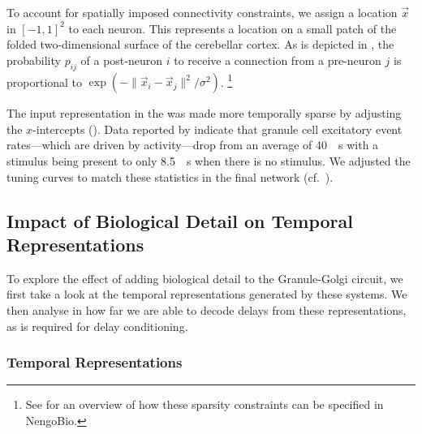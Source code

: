To account for spatially imposed connectivity constraints, we assign a location $\vec x$ in $[-1, 1]^2$ to each neuron.
This represents a location on a small patch of the folded two-dimensional surface of the cerebellar cortex.
As is depicted in , the probability $p_{ij}$ of a post-neuron $i$ to receive a connection from a pre-neuron $j$ is proportional to $\exp \left(- \| \vec x_i - \vec x_j \|^2 / \sigma^{2} \right)$.%
\footnote{See  for an overview of how these sparsity constraints can be specified in NengoBio.}

The input representation in the \PCN was made more temporally sparse by adjusting the $x$-intercepts ().
Data reported by \citet{chadderton2004integration} indicate that granule cell excitatory event rates---which are driven by \PCN activity---drop from an average of \SI{40}{\per\second} with a stimulus being present to only \SI{8.5}{\per\second} when there is no stimulus.
We adjusted the \PCN tuning curves to match these statistics in the final network (cf.~).


\subsection{Impact of Biological Detail on Temporal Representations}

To explore the effect of adding biological detail to the Granule-Golgi circuit, we first take a look at the temporal representations generated by these systems.
We then analyse in how far we are able to decode delays from these representations, as is required for delay conditioning.

\subsubsection{Temporal Representations}


